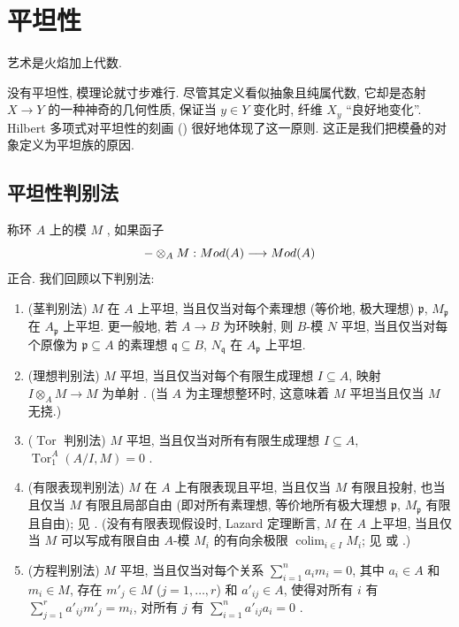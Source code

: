 \section{平坦性}\label{src:A.2}
\begin{epigraph}
艺术是火焰加上代数.
\end{epigraph}
没有平坦性, 模理论就寸步难行. 尽管其定义看似抽象且纯属代数, 它却是态射 $X\to Y$ 的一种神奇的几何性质, 保证当 $y\in Y$ 变化时, 纤维 $X_y$ ``良好地变化''. Hilbert 多项式对平坦性的刻画 () 很好地体现了这一原则. 这正是我们把模叠的对象定义为平坦族的原因.

\subsection{平坦性判别法}\label{src:A.2.1-subsection}
称环 $A$ 上的模 $M$ , 如果函子
\[
-\otimes_A M:Mod(A)\longrightarrow Mod(A)
\]
正合. 我们回顾以下判别法:
\begin{enumerate}[(1)]
\item (茎判别法) $M$ 在 $A$ 上平坦, 当且仅当对每个素理想 (等价地, 极大理想) $\mathfrak p$, $M_{\mathfrak p}$ 在 $A_{\mathfrak p}$ 上平坦. 更一般地, 若 $A\to B$ 为环映射, 则 $B$-模 $N$ 平坦, 当且仅当对每个原像为 $\mathfrak p\subseteq A$ 的素理想 $\mathfrak q\subseteq B$, $N_{\mathfrak q}$ 在 $A_{\mathfrak p}$ 上平坦.
\item (理想判别法) $M$ 平坦, 当且仅当对每个有限生成理想 $I\subseteq A$, 映射 $I\otimes_A M\to M$ 为单射 \cite[命题 $6.1$]{Eis95}. (当 $A$ 为主理想整环时, 这意味着 $M$ 平坦当且仅当 $M$ 无挠.)
\item ($\operatorname{Tor}$ 判别法) $M$ 平坦, 当且仅当对所有有限生成理想 $I\subseteq A$, $\operatorname{Tor}_1^A(A/I,M)=0$ \cite[命题 $6.1$]{Eis95}.
\item (有限表现判别法) $M$ 在 $A$ 上有限表现且平坦, 当且仅当 $M$ 有限且投射, 也当且仅当 $M$ 有限且局部自由 (即对所有素理想, 等价地所有极大理想 $\mathfrak p$, $M_{\mathfrak p}$ 有限且自由); 见 \cite[Tag 00NX]{SP}. (没有有限表现假设时, Lazard 定理断言, $M$ 在 $A$ 上平坦, 当且仅当 $M$ 可以写成有限自由 $A$-模 $M_i$ 的有向余极限 $\operatorname{colim}_{i\in I}M_i$; 见 \cite[A$6.6$]{Eis95} 或 \cite[Tag 058G]{SP}.)
\item (方程判别法) $M$ 平坦, 当且仅当对每个关系 $\sum_{i=1}^n a_i m_i=0$, 其中 $a_i\in A$ 和 $m_i\in M$, 存在 $m'_j\in M$ ($j=1,\ldots,r$) 和 $a'_{ij}\in A$, 使得对所有 $i$ 有 $\sum_{j=1}^r a'_{ij}m'_j=m_i$, 对所有 $j$ 有 $\sum_{i=1}^n a'_{ij}a_i=0$ \cite[推论 $6.5$]{Eis95}.
\end{enumerate}
